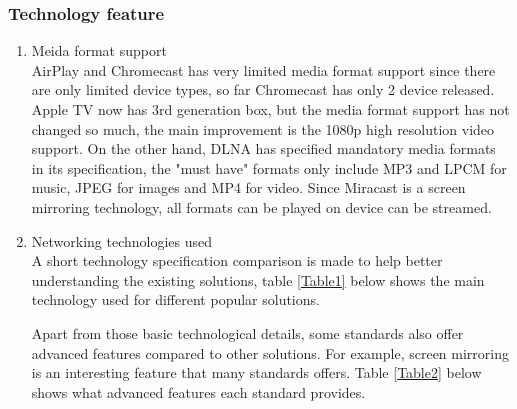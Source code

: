 \subsubsection{Technology feature}
\begin{enumerate}
\item Meida format support \\
AirPlay and Chromecast has very limited media format support since there are
only limited device types, so far Chromecast has only 2 device released. Apple
TV now has 3rd generation box, but the media format support has not changed so
much, the main improvement is the 1080p high resolution video support. On the
other hand, DLNA has specified mandatory media formats in its specification,
the "must have" formats only include MP3 and LPCM for music, JPEG for images and MP4 for video.
Since Miracast is a screen mirroring technology, all formats can be played on device can be streamed.

\item Networking technologies used \\

A short technology specification comparison is made to help better understanding
the existing solutions, table \ref{Table1} below shows the main technology used
for different popular solutions.
\begin{table}[htb]
\caption{Technology used comparison\label{Table1}}
\begin{center}
\end{center}
\end{table}

Apart from those basic technological details, some standards also offer advanced
features compared to other solutions. For example, screen mirroring is an
interesting feature that many standards offers. Table \ref{Table2} below shows
what advanced features each standard provides.
\begin{table}[htb]
\caption{Advanced feature comparison \label{Table2}}
\begin{center}
\end{center}
\end{table}



\end{enumerate}
